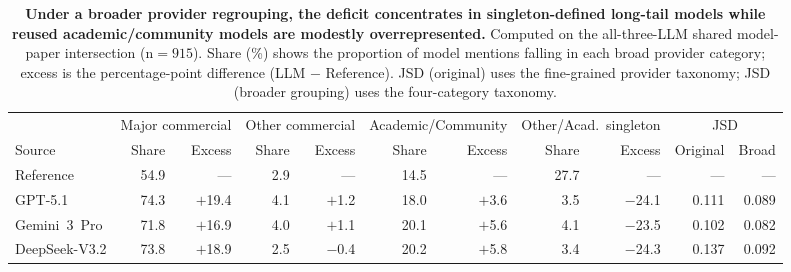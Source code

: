 \begin{table}[H]
\centering
\caption{\textbf{Under a broader provider regrouping, the deficit concentrates in singleton-defined long-tail models while reused academic/community models are modestly overrepresented.} Computed on the all-three-LLM shared model-paper intersection (n$=915$). Share (\%) shows the proportion of model mentions falling in each broad provider category; excess is the percentage-point difference (LLM $-$ Reference). JSD (original) uses the fine-grained provider taxonomy; JSD (broader grouping) uses the four-category taxonomy.}
\label{tab:provider_level1}
\begin{adjustbox}{max width=\textwidth}
\begin{tabular}{l rr rr rr rr rr}
\toprule
& \multicolumn{2}{c}{Major commercial} & \multicolumn{2}{c}{Other commercial} & \multicolumn{2}{c}{Academic/Community} & \multicolumn{2}{c}{Other/Acad.\ singleton} & \multicolumn{2}{c}{JSD} \\
\cmidrule(lr){2-3} \cmidrule(lr){4-5} \cmidrule(lr){6-7} \cmidrule(lr){8-9} \cmidrule(lr){10-11}
Source & Share & Excess & Share & Excess & Share & Excess & Share & Excess & Original & Broad \\
\midrule
Reference & 54.9 & --- & 2.9 & --- & 14.5 & --- & 27.7 & --- & --- & --- \\
\addlinespace
GPT-5.1 & 74.3 & $+$19.4 & 4.1 & $+$1.2 & 18.0 & $+$3.6 & 3.5 & $-$24.1 & 0.111 & 0.089 \\
Gemini~3~Pro & 71.8 & $+$16.9 & 4.0 & $+$1.1 & 20.1 & $+$5.6 & 4.1 & $-$23.5 & 0.102 & 0.082 \\
DeepSeek-V3.2 & 73.8 & $+$18.9 & 2.5 & $-$0.4 & 20.2 & $+$5.8 & 3.4 & $-$24.3 & 0.137 & 0.092 \\
\bottomrule
\end{tabular}
\end{adjustbox}
\end{table}